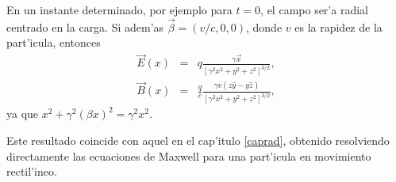 En un instante determinado, por ejemplo para $t=0$, el campo ser'a radial
centrado en la carga. Si adem'as $\vec{\beta}=({v}/{c},0,0)$, donde $v$ es
la rapidez de la part'icula, entonces
\begin{eqnarray}
\vec{E}(x)&=&q\frac{\gamma \vec{x}}{\left[\gamma^2 x^2+y^2+z^2\right] ^{3/2}} ,
\label{Evx}\\
\vec{B}(x)&=&\frac{q}{c}\frac{\gamma v \left( z\hat{y}-y\hat{z} \right)
}{\left[\gamma^2 x^2+y^2+z^2\right] ^{3/2}}, \label{Bvx}
\end{eqnarray}
ya que $ x^2+\gamma^2(\beta x)^2=\gamma^2x^2$.

Este resultado coincide con aquel en el cap'itulo \ref{caprad}, obtenido resolviendo directamente las ecuaciones de Maxwell para una part'icula en movimiento rectil'ineo.

%
